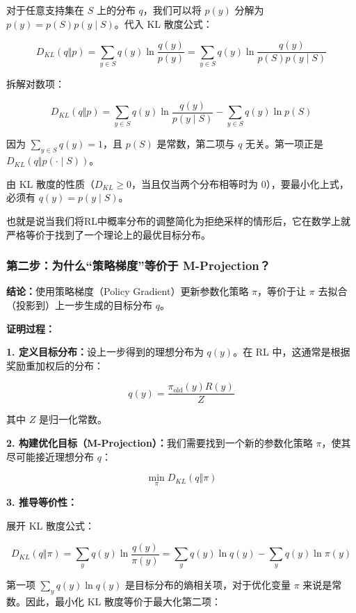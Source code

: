 对于任意支持集在 \(S\) 上的分布 \(q\)，我们可以将 \(p(y)\) 分解为 \(p(y)=p(S)p(y\mid S)\)。代入 KL 散度公式：

\[
D_{KL}(q\Vert p)
= \sum_{y\in S} q(y)\ln\frac{q(y)}{p(y)}
= \sum_{y\in S} q(y)\ln\frac{q(y)}{p(S)p(y\mid S)}
\]

拆解对数项：

\[
D_{KL}(q\Vert p)
= \sum_{y\in S} q(y)\ln\frac{q(y)}{p(y\mid S)}
- \sum_{y\in S} q(y)\ln p(S)
\]

因为 \(\sum_{y\in S}q(y)=1\)，且 \(p(S)\) 是常数，第二项与 \(q\) 无关。第一项正是 \(D_{KL}(q\Vert p(\cdot\mid S))\)。

由 KL 散度的性质（\(D_{KL}\ge 0\)，当且仅当两个分布相等时为 0），要最小化上式，必须有 \(q(y)=p(y\mid S)\)。

也就是说当我们将RL中概率分布的调整简化为拒绝采样的情形后，它在数学上就严格等价于找到了一个理论上的最优目标分布。

\hypertarget{ux7b2cux4e8cux6b65ux4e3aux4ec0ux4e48ux7b56ux7565ux68afux5ea6ux7b49ux4ef7ux4e8e-m-projection}{%
\subsubsection{第二步：为什么``策略梯度''等价于 M-Projection？}\label{ux7b2cux4e8cux6b65ux4e3aux4ec0ux4e48ux7b56ux7565ux68afux5ea6ux7b49ux4ef7ux4e8e-m-projection}}

\textbf{结论：}使用策略梯度（Policy Gradient）更新参数化策略 \(\pi\)，等价于让 \(\pi\) 去拟合（投影到）上一步生成的目标分布 \(q\)。

\textbf{证明过程：}

\textbf{1. 定义目标分布：}设上一步得到的理想分布为 \(q(y)\)。在 RL 中，这通常是根据奖励重加权后的分布：

\[
q(y)=\frac{\pi_{\mathrm{old}}(y)R(y)}{Z}
\]

其中 \(Z\) 是归一化常数。

\textbf{2. 构建优化目标（M-Projection）：}我们需要找到一个新的参数化策略 \(\pi\)，使其尽可能接近理想分布 \(q\)：

\[
\min_\pi D_{KL}(q\Vert \pi)
\]

\textbf{3. 推导等价性：}

展开 KL 散度公式：

\[
D_{KL}(q\Vert \pi)
= \sum_y q(y)\ln\frac{q(y)}{\pi(y)}
= \sum_y q(y)\ln q(y)-\sum_y q(y)\ln\pi(y)
\]

第一项 \(\sum_y q(y)\ln q(y)\) 是目标分布的熵相关项，对于优化变量 \(\pi\) 来说是常数。因此，最小化 KL 散度等价于最大化第二项：

